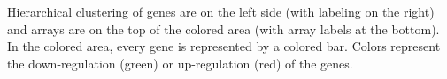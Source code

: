 \documentclass[oneside, a4paper, 11pt]{book}
\begin{document}
Hierarchical clustering of genes are on the left side (with labeling on the right) and arrays are on the top of the colored area (with array labels at the bottom). In the colored area, every gene is represented by a colored bar. Colors represent the down-regulation (green) or up-regulation (red) of the genes.

\begin{figure}[h]
    \centering
    \hspace{1em}%
    \hspace{1em}\\%
    \hspace{1em}%

\end{figure}
\end{document}
